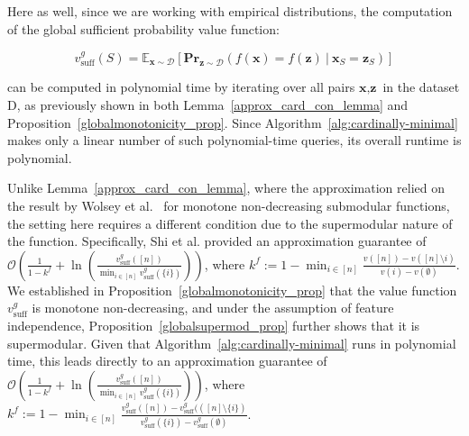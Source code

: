 \documentclass{article}
\newcommand{\z}{\textbf{z}}
\newcommand{\x}{\textbf{x}}
\begin{document}
Here as well, since we are working with empirical distributions, the computation of the global sufficient probability value function:

\begin{equation}
v^g_{\text{suff}}(S)=\mathbb{E}_{\x\sim\mathcal{D}}[
\textbf{Pr}_{\z\sim\mathcal{D}}(f(\x)= f(\z) \ | \ \x_{S}=\z_{S})]
\end{equation}

can be computed in polynomial time by iterating over all pairs $\x, \z$ in the dataset $\text{D}$, as previously shown in both Lemma~\ref{approx_card_con_lemma} and Proposition~\ref{globalmonotonicity_prop}. Since Algorithm~\ref{alg:cardinally-minimal} makes only a linear number of such polynomial-time queries, its overall runtime is polynomial.


Unlike Lemma~\ref{approx_card_con_lemma}, where the approximation relied on the result by Wolsey et al.~\citep{wolsey1982analysis} for monotone non-decreasing submodular functions, the setting here requires a different condition due to the supermodular nature of the function. Specifically, Shi et al.\citep{shi2021minimum} provided an approximation guarantee of $\mathcal{O}\left(\frac{1}{1-k^f}+\ln\left(\frac{v^g_{\text{suff}}([n])}{\min_{i \in [n]} v^g_{\text{suff}}(\{i\})}\right)\right)$, where $k^f := 1 - \min_{i \in [n]} \frac{v([n]) - v([n] \setminus {i})}{v({i}) - v(\emptyset)}$. We established in Proposition~\ref{globalmonotonicity_prop} that the value function $v^g_{\text{suff}}$ is monotone non-decreasing, and under the assumption of feature independence, Proposition~\ref{globalsupermod_prop} further shows that it is supermodular. Given that Algorithm~\ref{alg:cardinally-minimal} runs in polynomial time, this leads directly to an approximation guarantee of $\mathcal{O}\left(\frac{1}{1-k^f}+\ln\left(\frac{v^g_{\text{suff}}([n])}{\min_{i \in [n]} v^g_{\text{suff}}(\{i\})}\right)\right)$, where $k^f := 1 - \min_{i \in [n]} \frac{v^g_{\text{suff}}([n]) - v^g_{\text{suff}}(([n] \setminus \{i\})}{v^g_{\text{suff}}(\{i\}) - v^g_{\text{suff}}(\emptyset)}$.



\end{document}
